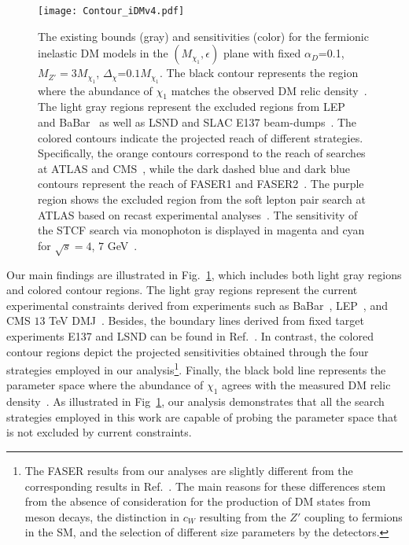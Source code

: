 \documentclass[preprint, superscriptaddress,amsmath, nofootinbib]{revtex4-1}
\begin{document}
\begin{figure}[t!]
\centering
\texttt{[image: Contour\_iDMv4.pdf]}
\caption{The existing bounds (gray) and sensitivities (color) for the fermionic inelastic DM models in the $\left(M_{\chi_1}, \epsilon\right)$ plane with fixed $\alpha_D$=0.1, $M_{Z'}=3 M_{\chi_1}$, $\Delta_{\chi}$=$0.1 M_{\chi_1}$. The black contour represents the region where the abundance of $\chi_1$ matches the observed DM relic density~\cite{Izaguirre:2015zva,PhysRevD.96.055007,Duerr:2019dmv}. The light gray regions represent the excluded regions from LEP~\cite{Hook:2010tw, Curtin:2014cca} and BaBar~\cite{BaBar:2017tiz} as well as LSND and SLAC E137 beam-dumps~\cite{Izaguirre:2017bqb}. The colored contours indicate the projected reach of different strategies. Specifically, the orange contours correspond to the reach of searches at ATLAS and CMS~\cite{PhysRevD.93.063523, Berlin:2018jbm}, while the dark dashed blue and dark blue contours represent the reach of FASER1 and FASER2~\cite{FASER:2018bac, FASER:2019aik, Feng:2017uoz}. The purple region shows the excluded region from the soft lepton pair search at ATLAS based on recast experimental analyses~\cite{ATLAS:2019lng}. The sensitivity of the STCF search via monophoton is displayed in magenta and cyan for $\sqrt{s} = 4$, $7$ GeV~\cite{Epifanov:2020elk}. 
}
\label{fig:2}
\end{figure}

Our main findings are illustrated in Fig.~\ref{fig:2}, which includes both light gray regions and colored contour regions. The light gray regions represent the current experimental constraints 
derived from experiments such as BaBar~\cite{BaBar:2017tiz}, LEP~\cite{Hook:2010tw, Curtin:2014cca}, and CMS $13$ TeV DMJ~\cite{CMS:2023bay}. Besides, the boundary lines derived from fixed target experiments E137 and LSND can be found in Ref.~\cite{Izaguirre:2017bqb}. In contrast, the colored contour regions depict the projected sensitivities obtained through the four strategies employed in our analysis\footnote{The FASER results from our analyses are slightly different from the corresponding results in Ref.~\cite{Berlin:2018jbm}. The main reasons for these differences stem from the absence of consideration for the production of DM states from meson decays, the distinction in $c_W$ resulting from the $Z'$ coupling to fermions in the SM, and the selection of different size parameters by the detectors.}. Finally, the black bold line represents the parameter space where the abundance of $\chi_1$ agrees with the measured DM relic density~\cite{Izaguirre:2015zva,PhysRevD.96.055007,Duerr:2019dmv}. As illustrated in Fig~\ref{fig:2}, our analysis demonstrates that all the search strategies employed in this work are capable of probing the parameter space that is not excluded by current constraints. 
\end{document}
